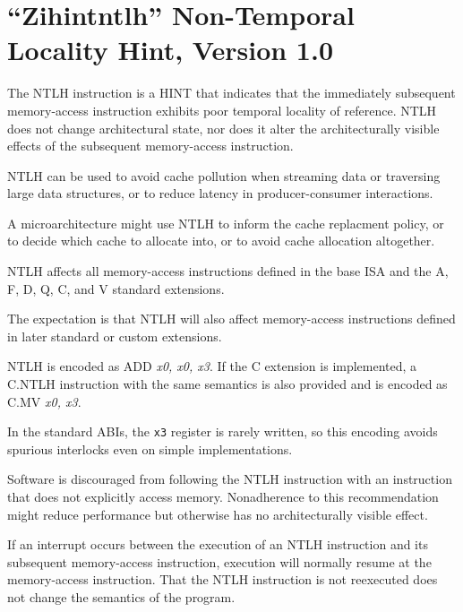 \chapter{``Zihintntlh'' Non-Temporal Locality Hint, Version 1.0}
\label{chap:zihintpause}

The NTLH instruction is a HINT that indicates that the immediately subsequent
memory-access instruction exhibits poor temporal locality of reference.
NTLH does not change architectural state, nor does it alter the architecturally
visible effects of the subsequent memory-access instruction.

\begin{commentary}
NTLH can be used to avoid cache pollution when streaming data or traversing
large data structures, or to reduce latency in producer-consumer interactions.

A microarchitecture might use NTLH to inform the cache replacment policy, or to
decide which cache to allocate into, or to avoid cache allocation altogether.
\end{commentary}

NTLH affects all memory-access instructions defined in the base ISA and
the A, F, D, Q, C, and V standard extensions.

\begin{commentary}
The expectation is that NTLH will also affect memory-access instructions
defined in later standard or custom extensions.
\end{commentary}

NTLH is encoded as ADD {\em x0, x0, x3}.
If the C extension is implemented, a C.NTLH instruction with the same semantics
is also provided and is encoded as C.MV {\em x0, x3}.

\begin{commentary}
In the standard ABIs, the \texttt{x3} register is rarely written, so this
encoding avoids spurious interlocks even on simple implementations.
\end{commentary}

Software is discouraged from following the NTLH instruction with an
instruction that does not explicitly access memory.
Nonadherence to this recommendation might reduce performance but
otherwise has no architecturally visible effect.

\begin{commentary}
If an interrupt occurs between the execution of an NTLH instruction and its
subsequent memory-access instruction, execution will normally resume at the
memory-access instruction.
That the NTLH instruction is not reexecuted does not change the semantics of
the program.
\end{commentary}
